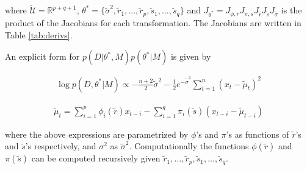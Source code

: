 where $\tilde{\mathcal{U}} = \mathbb{R}^{p+q+1}$, $\theta^* = \{\tilde{\sigma}^2, \tilde{r}_1, \dots, \tilde{r}_p, \tilde{s}_1, \dots, \tilde{s}_q \}$ and $J_{\theta^*} = J_{\phi, r} J_{\pi, s} J_{\tilde{r}} J_{\tilde{s}} J_{\tilde{\sigma}}$ is the product of the Jacobians for each transformation.  The Jacobians are written in Table \ref{tab:derivs}.

An explicit form for $p(D|\theta^*, M)p(\theta^*|M)$ is given by 

\begin{align*}\log p(D,\theta^*|M) \propto -\frac{n+2}{2}\tilde{\sigma}^2 -\frac{1}{2}e^{-\tilde{\sigma}^2}\sum_{t=1}^n (x_t - \tilde{\mu}_t)^2 \end{align*}

\begin{align*}\tilde{\mu}_t = \sum_{i=1}^p \phi_i(\tilde{r}) x_{t-i} - \sum_{i=1}^q \pi_i(\tilde{s})(x_{t-i}-\tilde{\mu}_{t-i}) \end{align*}

where the above expressions are parametrized by $\phi$'s and $\pi$'s as functions of $\tilde{r}$'s and $\tilde{s}$'s respectively, and $\sigma^2$ as $\tilde{\sigma}^2$.   Computationally the functions $\phi(\tilde{r})$ and $\pi(\tilde{s})$ can be computed recursively given $\tilde{r}_1, \dots, \tilde{r}_p, \tilde{s}_1, \dots, \tilde{s}_q$.

